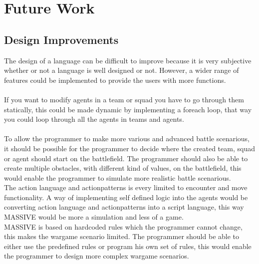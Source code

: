 \section{Future Work}
\subsection{Design Improvements}
The design of a language can be difficult to improve because it is very subjective whether or not a language is well designed or not. However, a wider range of features could be implemented to provide the users with more functions.\\\\
If you want to modify agents in a team or squad you have to go through them statically, this could be made dynamic by implementing a foreach loop, that way you could loop through all the agents in teams and agents.\\
\\
To allow the programmer to make more various and advanced battle scenarious, it should be possible for the programmer to decide where the created team, squad or agent should start on the battlefield. The programmer should also be able to create multiple obstacles, with different kind of values, on the battlefield, this would enable the programmer to simulate more realistic battle scenarious.\\

The action language and actionpatterns is every limited to encounter and move functionality. A way of implementing self defined logic into the agents would be converting action language and actionpatterns into a script language, this way MASSIVE would be more a simulation and less of a game.\\

MASSIVE is based on hardcoded rules which the programmer cannot change, this makes the wargame scenario limited. The programmer should be able to either use the predefined rules or program his own set of rules, this would enable the programmer to design more complex wargame scenarios.
\begin{comment}
@@@
To make the language more of a simulation and less of a game, it could also be implemented that the actionpatterns are not limited to the encounter and move functionality. These functionalities could be expanded by adding more states to the action interpreter. \\
A feature which enables the programmer to compare the current unit with units in its vicinity and act accordingly could also be implemented, this would give the agents a more independent and life-like behavior.
@@@
\end{comment}
